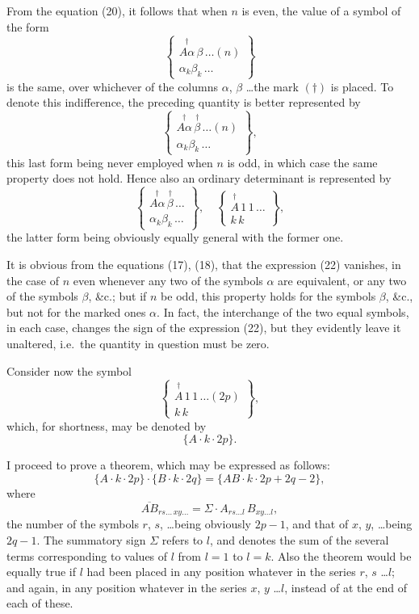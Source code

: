 \documentclass[11pt,a4paper]{article}
\theoremstyle{plain}
\theoremstyle{definition}
\theoremstyle{remark}
\begin{document}
From the equation (20), it follows that when $n$ is even, the value of a symbol
of the form
\[
\left\{
\begin{array}{c}
\stackrel{\dagger}{A\alpha}\,\beta\,\ldots(n) \\[2pt]
\hline
\alpha_k\beta_k\,\ldots
\end{array}
\right\}
\tag{22}
\]
is the same, over whichever of the columns $\alpha$, $\beta$ \ldots the mark $(\dagger)$ is placed. To
denote this indifference, the preceding quantity is better represented by
\[
\left\{
\begin{array}{c}
\stackrel{\dagger}{A\alpha}\,\stackrel{\dagger}{\beta}\,\ldots(n) \\[2pt]
\hline
\alpha_k\beta_k\,\ldots
\end{array}
\right\}
\tag{23},
\]
this last form being never employed when $n$ is odd, in which case the same property
does not hold. Hence also an ordinary determinant is represented by
\[
\left\{
\begin{array}{c}
\stackrel{\dagger}{A\alpha}\,\stackrel{\dagger}{\beta}\,\ldots \\[2pt]
\hline
\alpha_k\beta_k\,\ldots
\end{array}
\right\},
\quad
\left\{
\begin{array}{c}
\stackrel{\dagger}{A}\,1\,1\,\ldots \\[2pt]
\hline
k\,k
\end{array}
\right\}
\tag{24},
\]
the latter form being obviously equally general with the former one.

It is obvious from the equations (17), (18), that the expression (22) vanishes, in
the case of $n$ even whenever any two of the symbols $\alpha$ are equivalent, or any two
of the symbols $\beta$, \&c.; but if $n$ be odd, this property holds for the symbols $\beta$, \&c.,
but not for the marked ones $\alpha$. In fact, the interchange of the two equal symbols,
in each case, changes the sign of the expression (22), but they evidently leave it
unaltered, i.e.\ the quantity in question must be zero.

Consider now the symbol
\[
\left\{
\begin{array}{c}
\stackrel{\dagger}{A}\,1\,1\,\ldots(2p) \\[2pt]
\hline
k\,k
\end{array}
\right\}
\tag{25},
\]
which, for shortness, may be denoted by
\[
\{A\cdot k\cdot 2p\} \tag{26}.
\]

\newpage

I proceed to prove a theorem, which may be expressed as follows:
\[
\{A\cdot k\cdot 2p\}\cdot\{B\cdot k\cdot 2q\}=\{AB\cdot k\cdot 2p+2q-2\}
\tag{27},
\]
where
\[
\overline{AB}_{rs\ldots\,xy\ldots}=\Sigma\cdot A_{rs\ldots l}\,B_{xy\ldots l}
\tag{28},
\]
the number of the symbols $r$, $s$, \ldots being obviously $2p-1$, and that of $x$, $y$, \ldots being
$2q-1$. The summatory sign $\Sigma$ refers to $l$, and denotes the sum of the several terms
corresponding to values of $l$ from $l=1$ to $l=k$. Also the theorem would be equally
true if $l$ had been placed in any position whatever in the series $r$, $s$ \ldots $l$; and again,
in any position whatever in the series $x$, $y$ \ldots $l$, instead of at the end of each of these.
\end{document}
